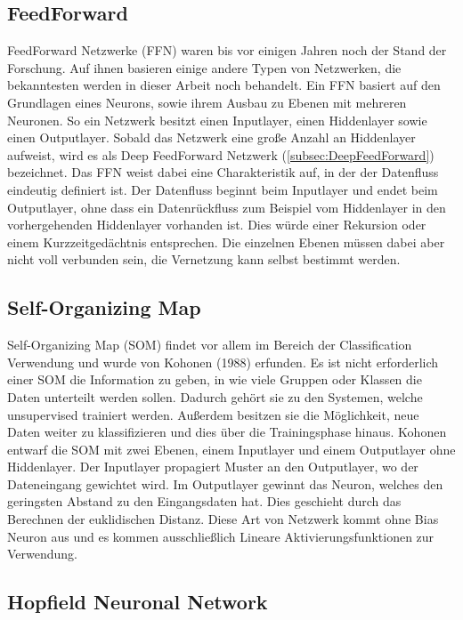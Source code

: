 \subsection{FeedForward}
\label{subsec:FeedForward}

FeedForward Netzwerke (FFN) waren bis vor einigen Jahren noch der Stand der Forschung.
Auf ihnen basieren einige andere Typen von Netzwerken, die bekanntesten werden in dieser Arbeit noch behandelt.
Ein FFN basiert auf den Grundlagen eines Neurons, sowie ihrem Ausbau zu Ebenen mit mehreren Neuronen.
So ein Netzwerk besitzt einen Inputlayer, einen Hiddenlayer sowie einen Outputlayer.
Sobald das Netzwerk eine große Anzahl an Hiddenlayer aufweist, wird es als Deep FeedForward Netzwerk (\ref{subsec:DeepFeedForward}) bezeichnet.
Das FFN weist dabei eine Charakteristik auf, in der der Datenfluss eindeutig definiert ist. 
Der Datenfluss beginnt beim Inputlayer und endet beim Outputlayer, ohne dass ein Datenrückfluss zum Beispiel vom Hiddenlayer in den vorhergehenden Hiddenlayer vorhanden ist.
Dies würde einer Rekursion oder einem Kurzzeitgedächtnis entsprechen.
Die einzelnen Ebenen müssen dabei aber nicht voll verbunden sein, die Vernetzung kann selbst bestimmt werden.

\subsection{Self-Organizing Map}
\label{subsec:SelfOrganizingMap}

Self-Organizing Map (SOM) findet vor allem im Bereich der Classification Verwendung und wurde von Kohonen (1988) erfunden. 
Es ist nicht erforderlich einer SOM die Information zu geben, in wie viele Gruppen oder Klassen die Daten unterteilt werden sollen. 
Dadurch gehört sie zu den Systemen, welche unsupervised trainiert werden. 
Außerdem besitzen sie die Möglichkeit, neue Daten weiter zu klassifizieren und dies über die Trainingsphase hinaus. 
Kohonen entwarf die SOM mit zwei Ebenen, einem Inputlayer und einem Outputlayer ohne Hiddenlayer. 
Der Inputlayer propagiert Muster an den Outputlayer, wo der Dateneingang gewichtet wird. 
Im Outputlayer gewinnt das Neuron, welches den geringsten Abstand zu den Eingangsdaten hat.
Dies geschieht durch das Berechnen der euklidischen Distanz. 
Diese Art von Netzwerk kommt ohne Bias Neuron aus und es kommen ausschließlich Lineare Aktivierungsfunktionen zur Verwendung.


\subsection{Hopfield Neuronal Network}

